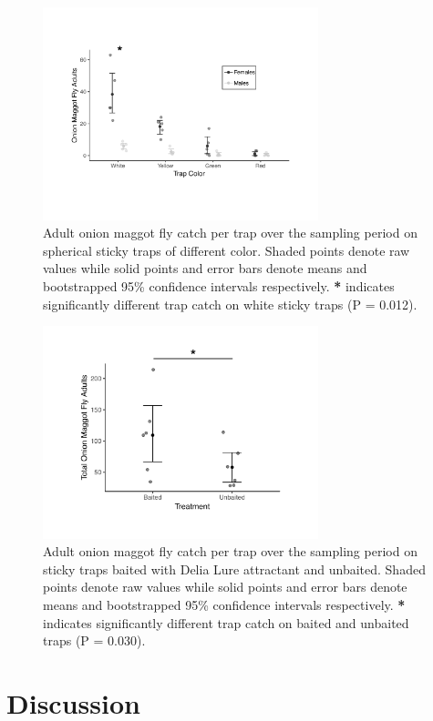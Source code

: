 \documentclass[alpha-refs]{wiley-article}
\begin{document}
\begin{figure}[bt]
\centering
\includegraphics[width = 8cm]{figures/publication/figure-3.pdf}
\caption{Adult onion maggot fly catch per trap over the sampling period on spherical sticky traps of different color.  Shaded points denote raw values while solid points and error bars denote means and bootstrapped 95\% confidence intervals respectively.  \textbf{*} indicates significantly different trap catch on white sticky traps (P = 0.012).}
\label{fig:figure3}
\end{figure}


\begin{figure}[bt]
\centering
\includegraphics[width = 8cm]{figures/publication/figure-4.pdf}
\caption{Adult onion maggot fly catch per trap over the sampling period on sticky traps baited with Delia Lure attractant and unbaited.  Shaded points denote raw values while solid points and error bars denote means and bootstrapped 95\% confidence intervals respectively.  \textbf{*} indicates significantly different trap catch on baited and unbaited traps (P = 0.030). }
\label{fig:figure4}
\end{figure}


\section{Discussion}
\end{document}
